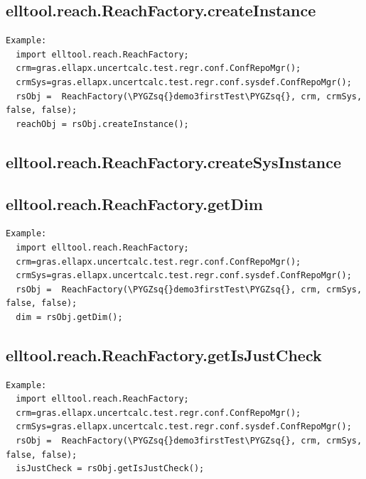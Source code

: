 \documentclass[letterpaper,10pt,english]{sphinxmanual}
\def\PYGZsq{\char`\'}
\begin{document}
\subsection{elltool.reach.ReachFactory.createInstance}
\label{chap_functions:elltool-reach-reachfactory-createinstance}
\begin{Verbatim}[commandchars=\\\{\}]
Example:
  import elltool.reach.ReachFactory;
  crm=gras.ellapx.uncertcalc.test.regr.conf.ConfRepoMgr();
  crmSys=gras.ellapx.uncertcalc.test.regr.conf.sysdef.ConfRepoMgr();
  rsObj =  ReachFactory(\PYGZsq{}demo3firstTest\PYGZsq{}, crm, crmSys, false, false);
  reachObj = rsObj.createInstance();
\end{Verbatim}


\subsection{elltool.reach.ReachFactory.createSysInstance}
\label{chap_functions:elltool-reach-reachfactory-createsysinstance}

\subsection{elltool.reach.ReachFactory.getDim}
\label{chap_functions:elltool-reach-reachfactory-getdim}
\begin{Verbatim}[commandchars=\\\{\}]
Example:
  import elltool.reach.ReachFactory;
  crm=gras.ellapx.uncertcalc.test.regr.conf.ConfRepoMgr();
  crmSys=gras.ellapx.uncertcalc.test.regr.conf.sysdef.ConfRepoMgr();
  rsObj =  ReachFactory(\PYGZsq{}demo3firstTest\PYGZsq{}, crm, crmSys, false, false);
  dim = rsObj.getDim();
\end{Verbatim}


\subsection{elltool.reach.ReachFactory.getIsJustCheck}
\label{chap_functions:elltool-reach-reachfactory-getisjustcheck}
\begin{Verbatim}[commandchars=\\\{\}]
Example:
  import elltool.reach.ReachFactory;
  crm=gras.ellapx.uncertcalc.test.regr.conf.ConfRepoMgr();
  crmSys=gras.ellapx.uncertcalc.test.regr.conf.sysdef.ConfRepoMgr();
  rsObj =  ReachFactory(\PYGZsq{}demo3firstTest\PYGZsq{}, crm, crmSys, false, false);
  isJustCheck = rsObj.getIsJustCheck();
\end{Verbatim}
\end{document}
